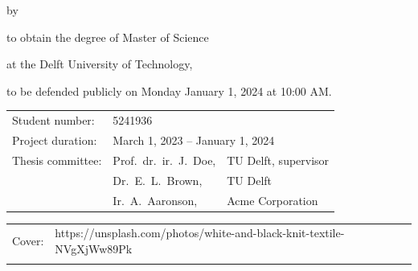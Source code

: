 \begin{titlepage}

\begin{center}

{\makeatletter
\largetitlestyle\fontsize{45}{45}\selectfont\@title
\makeatother}

{\makeatletter
\ifdefvoid{\@subtitle}{}{\bigskip\titlestyle\fontsize{20}{20}\selectfont\@subtitle}
\makeatother}

\bigskip
\bigskip

by

\bigskip
\bigskip

{\makeatletter
\largetitlestyle\fontsize{25}{25}\selectfont\@author
\makeatother}

\bigskip
\bigskip

to obtain the degree of Master of Science

at the Delft University of Technology,

to be defended publicly on Monday January 1, 2024 at 10:00 AM.

\vfill

\begin{tabular}{lll}
    Student number: & 5241936 \\
    Project duration: & \multicolumn{2}{l}{March 1, 2023 -- January 1, 2024} \\
    Thesis committee: & Prof.\ dr.\ ir.\ J.\ Doe, & TU Delft, supervisor \\
        & Dr.\ E.\ L.\ Brown, & TU Delft \\
        & Ir.\ A.\ Aaronson, & Acme Corporation
\end{tabular}

\bigskip
\bigskip

\bigskip
\bigskip
\begin{tabular}{p{15mm}p{10cm}}
 Cover: & https://unsplash.com/photos/white-and-black-knit-textile-NVgXjWw89Pk \\
 \\
\end{tabular}


\end{center}
\end{titlepage}
